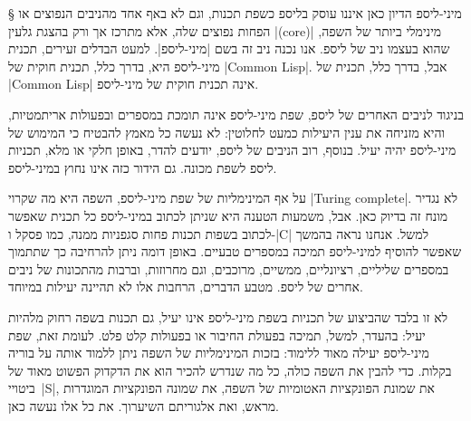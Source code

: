 %
%
%
%

§ מיני-ליספ
הדיון כאן איננו עוסק בליספ כשפת תכנות, וגם לא באף אחד מהניבים הנפוצים או הפחות
נפוצים שלה, אלא מתרכז אך ורק בהצגת גלעין \E|(core)| מינימלי ביותר של השפה, שהוא
בעצמו ניב של ליספ. אנו נכנה ניב זה בשם \ע|מיני-ליספ|. למעט הבדלים זעירים, תכנית
מיני-ליספ היא, בדרך כלל, תכנית חוקית של \E|Common Lisp|. אבל, בדרך כלל, תכנית
של \E|Common Lisp| אינה תכנית חוקית של מיני-ליספ.

בניגוד לניבים האחרים של ליספ, שפת מיני-ליספ אינה תומכת במספרים ובפעולות
אריתמטיות, והיא מזניחה את ענין היעילות כמעט לחלוטין: לא נעשה כל מאמץ להבטיח כי
המימוש של מיני-ליספ יהיה יעיל. בנוסף, רוב הניבים של ליספ, יודעים להדר, באופן
חלקי או מלא, תכניות ליספ לשפת מכונה. גם הידור כזה אינו נחוץ במיני-ליספ.

על אף המינימליות של שפת מיני-ליספ, השפה היא מה שקרוי \E|Turing complete|. לא
נגדיר מונח זה בדיוק כאן. אבל, משמעות הטענה היא שניתן לכתוב במיני-ליספ כל תכנית
שאפשר לכתוב בשפות תכנות פחות סגפניות ממנה, כמו פסקל ו-\E|C| למשל. אנחנו
נראה בהמשך שאפשר להוסיף למיני-ליספ תמיכה במספרים טבעיים. באופן דומה ניתן
להרחיבה כך שתתמוך במספרים שליליים, רציונליים, ממשיים, מרוכבים, וגם מחרוזות,
וברבות מהתכונות של ניבים אחרים של ליספ. מטבע הדברים, הרחבות אלו לא תהיינה
יעילות במיוחד.

לא זו בלבד שהביצוע של תכניות בשפת מיני-ליספ אינו יעיל, גם תכנות בשפה רחוק
מלהיות יעיל: בהעדר, למשל, תמיכה בפעולת החיבור או בפעולות קלט פלט. לעומת זאת,
שפת מיני-ליספ יעילה מאוד ללימוד: בזכות המינימליות של השפה ניתן ללמוד אותה על
בוריה בקלות. כדי להבין את השפה כולה, כל מה שנדרש להכיר הוא את הדקדוק הפשוט
מאוד של ביטויי~\E|S|, את שמונת הפונקציות האטומיות של השפה, את שמונה הפונקציות
המוגדרות מראש, ואת אלגוריתם השיערוך. את כל אלו נעשה כאן.

